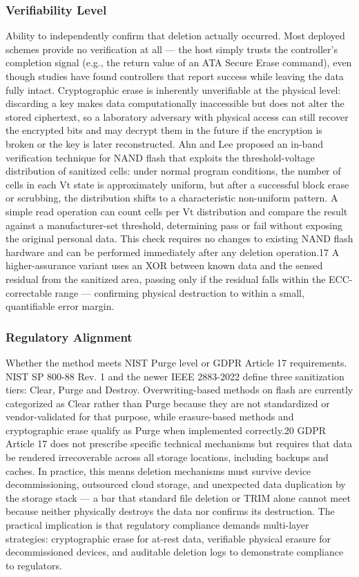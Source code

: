 \subsubsection{Verifiability Level}
Ability to independently confirm that deletion actually occurred. Most deployed schemes provide no 
verification at all — the host simply trusts the controller's completion signal (e.g., the return value 
of an ATA Secure Erase command), even though studies have found controllers that report success while 
leaving the data fully intact. Cryptographic erase is inherently unverifiable at the physical level: 
discarding a key makes data computationally inaccessible but does not alter the stored ciphertext, so a 
laboratory adversary with physical access can still recover the encrypted bits and may decrypt them in 
the future if the encryption is broken or the key is later reconstructed. Ahn and Lee proposed an 
in-band verification technique for NAND flash that exploits the threshold-voltage distribution of 
sanitized cells: under normal program conditions, the number of cells in each Vt state is approximately 
uniform, but after a successful block erase or scrubbing, the distribution shifts to a characteristic 
non-uniform pattern. A simple read operation can count cells per Vt distribution and compare the 
result against a manufacturer-set threshold, determining pass or fail without exposing the original 
personal data. This check requires no changes to existing NAND flash hardware and can be performed 
immediately after any deletion operation.17 A higher-assurance variant uses an XOR between known data 
and the sensed residual from the sanitized area, passing only if the residual falls within the 
ECC-correctable range — confirming physical destruction to within a small, quantifiable error margin.

\subsubsection{Regulatory Alignment}
Whether the method meets NIST Purge level or GDPR Article 17 requirements. NIST SP 800-88 Rev. 1 and the 
newer IEEE 2883-2022 define three sanitization tiers: Clear, Purge and Destroy. Overwriting-based 
methods on flash are currently categorized as Clear rather than Purge because they are not standardized 
or vendor-validated for that purpose, while erasure-based methods and cryptographic erase qualify as 
Purge when implemented correctly.20 GDPR Article 17 does not prescribe specific technical mechanisms but 
requires that data be rendered irrecoverable across all storage locations, including backups and caches. 
In practice, this means deletion mechanisms must survive device decommissioning, outsourced cloud 
storage, and unexpected data duplication by the storage stack — a bar that standard file deletion or 
TRIM alone cannot meet because neither physically destroys the data nor confirms its destruction. The 
practical implication is that regulatory compliance demands multi-layer strategies: cryptographic erase 
for at-rest data, verifiable physical erasure for decommissioned devices, and auditable deletion logs to 
demonstrate compliance to regulators.


